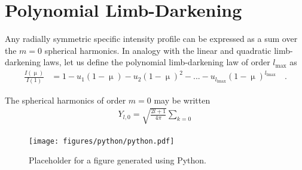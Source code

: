 \documentclass[modern]{aastex61}
\begin{document}
%
\section{Polynomial Limb-Darkening}
\label{sec:quad}

Any radially symmetric specific intensity profile can be expressed as a sum
over the $m = 0$ spherical harmonics. In analogy with the linear and quadratic
limb-darkening laws, let us define the polynomial limb-darkening law of
order $l_\mathrm{max}$ as
%
%
\begin{align}
    \label{eq:polynomialld}
    \frac{I(\upmu)}{I(1)} &= 1 - u_1 (1 - \upmu) - u_2 (1 - \upmu)^2 - ... - u_{l_\mathrm{lmax}}(1 - \upmu)^{l_\mathrm{lmax}}
    \quad.
\end{align}
%

The spherical harmonics of order $m = 0$ may be written
%
\begin{align}
    Y_{l,0} = \sqrt{\frac{2l + 1}{4\pi}}
              \sum_{k=0}
\end{align}

\begin{figure}[t!]
    \begin{centering}
    \texttt{[image: figures/python/python.pdf]}
    \caption{\label{fig:python} Placeholder for a figure generated using Python. }
    \end{centering}
\end{figure}



\end{document}
